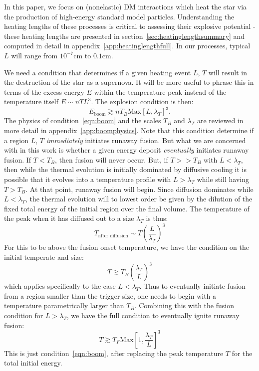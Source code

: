 \documentclass[twocolumn,showpacs,preprintnumbers,amsmath,amssymb,prl]{revtex4}
\newcommand{\cm}{\text{cm}}
\def\r{\right)}
\def\l{\left(}
\begin{document}
In this paper, we focus on (nonelastic) DM interactions which heat the star via the production of high-energy standard model particles. Understanding the heating lengths of these processes is critical to assessing their explosive potential - these heating lengths are presented in section~\ref{sec:heatinglengthsummary} and computed in detail in appendix~\ref{app:heatinglengthfull}.  In our processes, typical $L$ will range from $10^{-7} \cm$ to $0.1 \cm$.

We need a condition that determines if a given heating event $L$, $T$ will result in the destruction of the star as a supernova.  It will be more useful to phrase this in terms of the excess energy $E$ within the temperature peak instead of the temperature itself $E \sim n T L^3$. The explosion condition is then:
\begin{equation}
\label{eqn:boom}
E_{\text{boom}} \gtrsim n T_B \text{Max}\left[L, \lambda_T\right]^3. 
\end{equation}
The physics of condition~\ref{eqn:boom} and the scales $T_B$ and $\lambda_T$ are reviewed in more detail in appendix~\ref{app:boomphysics}. Note that this condition determine if a region $L$, $T$ \emph{immediately} initiates runaway fusion.  But what we are concerned with in this work is whether a given energy deposit \emph{eventually} initiates runaway fusion.  If $T < T_B$, then fusion will never occur. But, if $T >> T_B$ with $L < \lambda_T$, then while the thermal evolution is initially dominated by diffusive cooling it is possible that it evolves into a temperature profile with $L > \lambda_T$ while still having $T > T_B$. At that point, runaway fusion will begin.  Since diffusion dominates while $L<\lambda_T$, the thermal evolution will to lowest order be given by the dilution of the fixed total energy of the initial region over the final volume.  The temperature of the peak when it has diffused out to a size $\lambda_T$ is thus:
\[
    T_{\text{after diffusion}} \sim T \l \frac{L}{\lambda_T} \r^3  
\]
For this to be above the fusion onset temperature, we have the condition on the initial temperate and size:
\[
    T \gtrsim T_B \l \frac{\lambda_T}{L} \r^3
\]
which applies specifically to the case $L < \lambda_T$. Thus to eventually initiate fusion from a region smaller than the trigger size, one needs to begin with a temperature parametrically larger than $T_B$.  Combining this with the fusion condition for $L>\lambda_T$, we have the full condition to eventually ignite runaway fusion:
\[
    T \gtrsim T_F \text{Max}\left[1, \frac{\lambda_T}{L}\right]^3
\]
 This is just condition~\ref{eqn:boom}, after replacing the peak temperature $T$ for the total initial energy.
\end{document}
